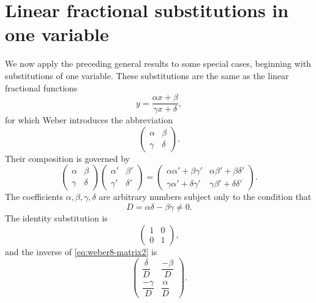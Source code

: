 \documentclass[11pt,a4paper]{book}
\begin{document}
\section*{Linear fractional substitutions in one variable}
We now apply the preceding general results to some special cases, beginning with substitutions of one variable.  These substitutions are the same as the linear fractional functions
\begin{equation}\label{eq:weber8-mobius}
y=\frac{\alpha x+\beta}{\gamma x+\delta},
\end{equation}
for which Weber introduces the abbreviation
\begin{equation}\label{eq:weber8-matrix2}
\begin{pmatrix}\alpha&\beta\\ \gamma&\delta\end{pmatrix}.
\end{equation}
Their composition is governed by
\begin{equation}\label{eq:weber8-mobius-product}
\begin{pmatrix}\alpha&\beta\\ \gamma&\delta\end{pmatrix}
\begin{pmatrix}\alpha'&\beta'\\ \gamma'&\delta'\end{pmatrix}
=
\begin{pmatrix}
\alpha\alpha'+\beta\gamma'&\alpha\beta'+\beta\delta'\\
\gamma\alpha'+\delta\gamma'&\gamma\beta'+\delta\delta'
\end{pmatrix}.
\end{equation}
The coefficients $\alpha,\beta,\gamma,\delta$ are arbitrary numbers subject only to the condition that
\[
D=\alpha\delta-\beta\gamma\ne0.
\]
The identity substitution is
\begin{equation}\label{eq:weber8-mobius-id}
\begin{pmatrix}1&0\\0&1\end{pmatrix},
\end{equation}
and the inverse of \eqref{eq:weber8-matrix2} is
\begin{equation}\label{eq:weber8-mobius-inverse}
\begin{pmatrix}
\dfrac{\delta}{D}&\dfrac{-\beta}{D}\\[6pt]
\dfrac{-\gamma}{D}&\dfrac{\alpha}{D}
\end{pmatrix}.
\end{equation}
\end{document}
